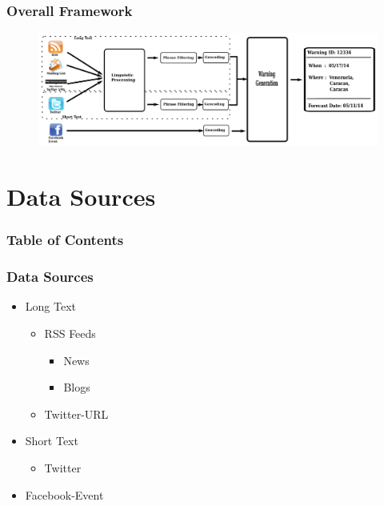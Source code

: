 \documentclass[red]{beamer}
\begin{document}
\begin{frame}
\frametitle{Overall Framework}
\begin{figure}
    \centering
    \includegraphics[height=0.6\textheight,width=\textwidth]{pipeline}
\end{figure}
\end{frame}


\section{Data Sources}
\begin{frame}
\frametitle{Table of Contents}
\tableofcontents[currentsection]
\end{frame}
\begin{frame}
    \frametitle{Data Sources}
    \begin{itemize}
        \item
            Long Text
            \begin{itemize}
                \item
                    RSS Feeds
                    \begin{itemize}
                        \item
                            News
                        \item
                            Blogs
                    \end{itemize}
                \item
                    Twitter-URL
            \end{itemize}
        \item
            Short Text
                \begin{itemize}
                    \item
                        Twitter
                \end{itemize}
        \item
            Facebook-Event

    \end{itemize}
\end{frame}
\end{document}
